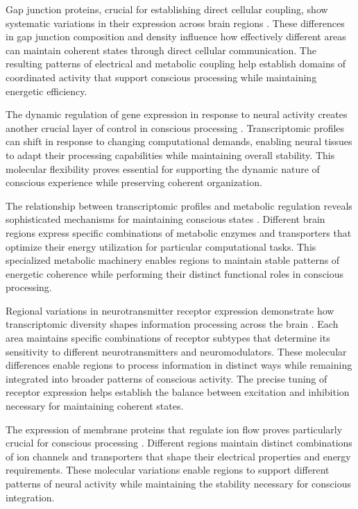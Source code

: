 Gap junction proteins, crucial for establishing direct cellular coupling, show systematic variations in their expression across brain regions \cite{Yuste2020}. These differences in gap junction composition and density influence how effectively different areas can maintain coherent states through direct cellular communication. The resulting patterns of electrical and metabolic coupling help establish domains of coordinated activity that support conscious processing while maintaining energetic efficiency.

The dynamic regulation of gene expression in response to neural activity creates another crucial layer of control in conscious processing \cite{Fishell2020}. Transcriptomic profiles can shift in response to changing computational demands, enabling neural tissues to adapt their processing capabilities while maintaining overall stability. This molecular flexibility proves essential for supporting the dynamic nature of conscious experience while preserving coherent organization.

The relationship between transcriptomic profiles and metabolic regulation reveals sophisticated mechanisms for maintaining conscious states \cite{Macosko2015}. Different brain regions express specific combinations of metabolic enzymes and transporters that optimize their energy utilization for particular computational tasks. This specialized metabolic machinery enables regions to maintain stable patterns of energetic coherence while performing their distinct functional roles in conscious processing.

Regional variations in neurotransmitter receptor expression demonstrate how transcriptomic diversity shapes information processing across the brain \cite{Saunders2018}. Each area maintains specific combinations of receptor subtypes that determine its sensitivity to different neurotransmitters and neuromodulators. These molecular differences enable regions to process information in distinct ways while remaining integrated into broader patterns of conscious activity. The precise tuning of receptor expression helps establish the balance between excitation and inhibition necessary for maintaining coherent states.

The expression of membrane proteins that regulate ion flow proves particularly crucial for conscious processing \cite{Zeisel2018}. Different regions maintain distinct combinations of ion channels and transporters that shape their electrical properties and energy requirements. These molecular variations enable regions to support different patterns of neural activity while maintaining the stability necessary for conscious integration.

